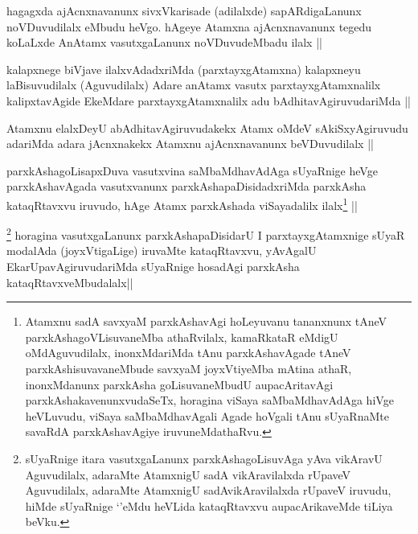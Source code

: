 \begin{artha}
hagagxda ajAcnxnavanunx sivxVkarisade (adilalxde) sapARdigaLanunx noVDuvudilalx eMbudu heVgo. hAgeye Atamxna ajAcnxnavanunx tegedu koLaLxde AnAtamx vasutxgaLanunx noVDuvudeMbadu ilalx ||
\end{artha}


\begin{artha}
kalapxnege biVjave ilalxvAdadxriMda (parxtayxgAtamxna) kalapxneyu laBisuvudilalx (Aguvudilalx) Adare anAtamx vasutx parxtayxgAtamxnalilx kalipxtavAgide EkeMdare parxtayxgAtamxnalilx adu bAdhitavAgiruvudariMda ||
\end{artha}


\begin{artha}
Atamxnu elalxDeyU abAdhitavAgiruvudakekx Atamx oMdeV sAkiSxyAgiruvudu adariMda adara jAcnxnakekx Atamxnu ajAcnxnavanunx beVDuvudilalx ||
\end{artha}


\begin{artha}
parxkAshagoLisapxDuva vasutxvina saMbaMdhavAdAga sUyaRnige heVge parxkAshavAgada vasutxvanunx parxkAshapaDisidadxriMda parxkAsha kataqRtavxvu iruvudo, hAge Atamx parxkAshada viSayadalilx ilalx\footnote{Atamxnu sadA savxyaM parxkAshavAgi hoLeyuvanu tananxnunx tAneV parxkAshagoVLisuvaneMba athaRvilalx, kamaRkataR eMdigU oMdAguvudilalx, inonxMdariMda tAnu parxkAshavAgade tAneV parxkAshisuvavaneMbude savxyaM joyxVtiyeMba mAtina athaR, inonxMdanunx parxkAsha goLisuvaneMbudU aupacAritavAgi parxkAshakavenunxvudaSeTx, horagina viSaya saMbaMdhavAdAga hiVge heVLuvudu, viSaya saMbaMdhavAgali Agade hoVgali tAnu sUyaRnaMte savaRdA parxkAshavAgiye iruvuneMdathaRvu.} ||
\end{artha}

\begin{artha}
\footnote{sUyaRnige itara vasutxgaLanunx parxkAshagoLisuvAga yAva vikAravU Aguvudilalx, adaraMte AtamxnigU sadA vikAravilalxda rUpaveV Aguvudilalx, adaraMte AtamxnigU sadAvikAravilalxda rUpaveV iruvudu, hiMde sUyaRnige `\stext'eMdu heVLida kataqRtavxvu aupacArikaveMde tiLiya beVku.}
horagina vasutxgaLanunx parxkAshapaDisidarU I parxtayxgAtamxnige sUyaR modalAda (joyxVtigaLige) iruvaMte kataqRtavxvu, yAvAgalU EkarUpavAgiruvudariMda sUyaRnige hosadAgi parxkAsha kataqRtavxveMbudalalx||
\end{artha}

